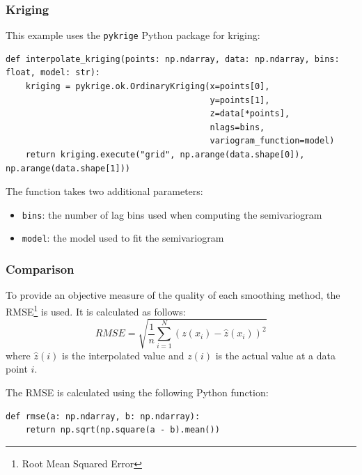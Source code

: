 \subsubsection{Kriging}
\enlargethispage{1pt}
This example uses the \verb|pykrige| Python package for kriging:
\begin{lstlisting}[language={[AS]Python},caption=Interpolation with Kriging]
def interpolate_kriging(points: np.ndarray, data: np.ndarray, bins: float, model: str):
    kriging = pykrige.ok.OrdinaryKriging(x=points[0],
                                         y=points[1],
                                         z=data[*points],
                                         nlags=bins,
                                         variogram_function=model)
    return kriging.execute("grid", np.arange(data.shape[0]), np.arange(data.shape[1]))
\end{lstlisting}

The function takes two additional parameters:
\begin{itemize}
    \item \verb|bins|: the number of lag bins used when computing the semivariogram
    \item \verb|model|: the model used to fit the semivariogram
\end{itemize}

\subsubsection{Comparison}

To provide an objective measure of the quality of each smoothing method, the RMSE\footnote{Root Mean Squared Error} is used. It is calculated as follows:
\[
RMSE=\sqrt{\frac{1}{n}\sum_{i=1}^N{\left(z(x_i)-\hat{z}(x_i)\right)}^2}
\]
\nolinebreak\cite{shape:book01} where $\hat{z}(i)$ is the interpolated value and $z(i)$ is the actual value at a data point $i$.

The RMSE is calculated using the following Python function:
\begin{lstlisting}[language={[AS]Python},caption=Calculate RMSE]
def rmse(a: np.ndarray, b: np.ndarray):
    return np.sqrt(np.square(a - b).mean())
\end{lstlisting}


